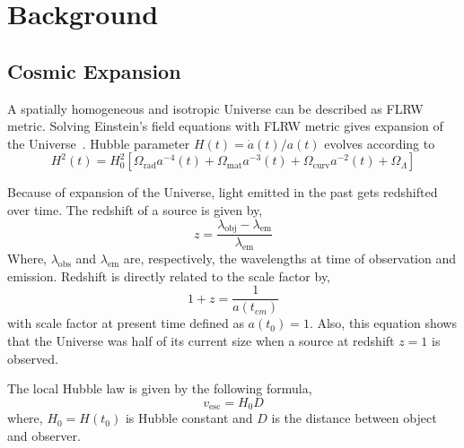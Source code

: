 \section[Background]{Background}
\subsection{Cosmic Expansion}
A spatially homogeneous and isotropic Universe can be described as FLRW metric. Solving Einstein's field equations with FLRW metric gives expansion of the Universe~\cite{TEU}. Hubble parameter $H(t)=\dot{a}(t)/a(t)$ evolves according to
\begin{equation}
H^2(t) = H_0^2 \left[ \Omega_\text{rad} a^{-4}(t) + \Omega_\text{mat}a^{-3}(t) + \Omega_\text{curv}a^{-2} (t) + \Omega_\Lambda \right]
\end{equation}

Because of expansion of the Universe, light emitted in the past gets redshifted over time. The redshift of a source is given by,
\begin{equation}
z=\frac{\lambda_\text{obj}-\lambda_\text{em}}{\lambda_\text{em}}
\label{math:z}
\end{equation}
\noindent
Where, $\lambda_\text{obs}$ and $\lambda_\text{em}$ are, respectively, the wavelengths at time of observation and emission.
Redshift is directly related to the scale factor by,
\begin{equation}
1+z=\frac{1}{a(t_{em})}
\end{equation}
with scale factor at present time defined as $a(t_0) = 1$. Also, this equation shows that the Universe was half of its current size when a source at redshift $z= 1$ is observed.

The local Hubble law is given by the following formula,\\
 \begin{equation}
    v_\text{esc}=H_{0}D
 \label{Hubble}
 \end{equation}
 where, $H_{0} = H(t_0)$ is Hubble constant and $D$ is the distance between object and observer.
  
